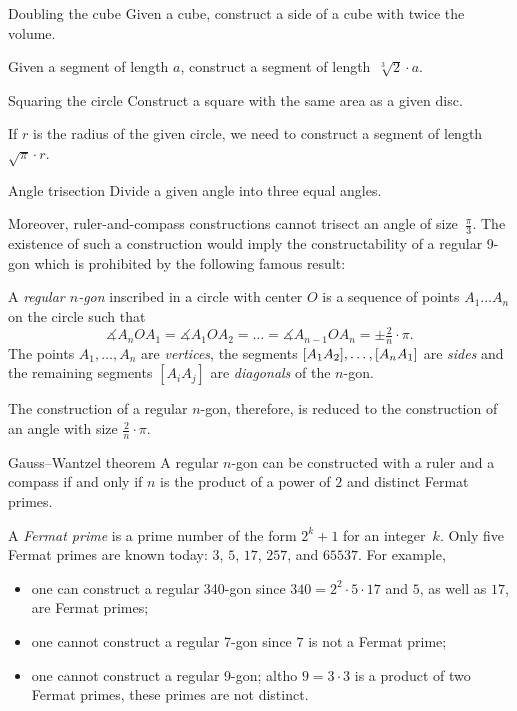 \begin{thm*}{Doubling the cube}
Given a cube, construct a side of a cube with twice the volume.
\end{thm*}

Given a segment of length $a$,
construct a segment of length~$\sqrt[3]{2}\cdot a$.

\begin{thm*}{Squaring the circle}
Construct a square with the same area as a given disc.
\end{thm*}

If $r$ is the radius of the given circle, we need to construct a segment of length~$\sqrt{\pi}\cdot r$. 

\begin{thm*}{Angle trisection} 
Divide a given angle into three equal angles.
\end{thm*}

Moreover, ruler-and-compass constructions cannot trisect an angle of size~$\tfrac\pi3$. 
The existence of such a construction would imply the constructability of a regular 9-gon which is prohibited by the following famous result:

A \emph{regular $n$-gon} inscribed in a circle with center $O$ is a sequence of points $A_1\dots A_n$ on the circle such that 
\[\measuredangle A_nOA_1=\measuredangle A_1OA_2=\dots=\measuredangle A_{n-1}OA_n=\pm\tfrac2n\cdot \pi.\]
The points $A_1,\dots, A_n$ are \emph{vertices},
the segments $[A_1A_2], \z\dots, [A_nA_1]$ are \emph{sides} 
and the remaining segments $[A_iA_j]$ are \emph{diagonals} of the $n$-gon.

The construction of a regular $n$-gon, therefore, is reduced to the construction of an angle with size $\tfrac2n\cdot \pi$.

\begin{thm}{Gauss--Wantzel theorem}
A regular $n$-gon can be constructed with a ruler and a compass 
if and only if 
$n$ is the product of a power of $2$ and distinct Fermat primes.
\end{thm}

A \emph{Fermat prime} is a prime number of the form $2^k+1$ for an integer~$k$.
Only five Fermat primes are known  today: $3$, $5$, $17$, $257$, and $65537$.
For example, 
\begin{itemize}
\item one can construct a regular 340-gon since $340=2^2\cdot 5\cdot 17$ and $5$, as well as $17$, are Fermat primes;
\item one cannot construct a regular 7-gon since $7$ is not a Fermat prime;
\item one cannot construct a regular 9-gon; 
altho $9=3\cdot 3$ is a product of two Fermat primes, 
these primes are not distinct.
\end{itemize}

